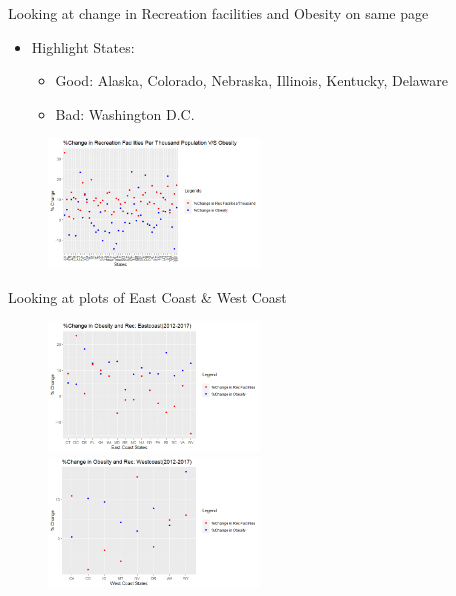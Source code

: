\documentclass{beamer} %
\begin{document}
\begin{frame}{Looking at change in Recreation facilities and Obesity on same page}
  \begin{itemize}
   \item Highlight States:
   \begin{itemize}
    \item Good: Alaska, Colorado, Nebraska, Illinois, Kentucky, Delaware
    \item Bad: Washington D.C.
   \end {itemize}
  \end{itemize}
 \begin{figure}
   \includegraphics[width=0.5\textwidth]{ObesityRecPTH.png}
   \hfill
 \end{figure}
\end{frame}
\begin{frame}{Looking at plots of East Coast & West Coast}
  \begin{figure}
   \includegraphics[width=0.5\textwidth]{Eastplot.png}
   \hfill
   \includegraphics[width=0.5\textwidth]{Westplot.png}
  \end{figure}
\end{frame}
\end{document}

